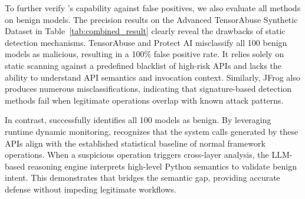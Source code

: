 To further verify \toolname{}'s capability against false positives, we also evaluate all methods on benign models.
The precision results on the Advanced TensorAbuse Synthetic Dataset in Table~\ref{tab:combined_result} clearly reveal the drawbacks of static detection mechanisms. TensorAbuse and Protect AI misclassify all 100 benign models as malicious, resulting in a 100\% false positive rate. It relies solely on static scanning against a predefined blacklist of high-risk APIs and lacks the ability to understand API semantics and invocation context. Similarly, JFrog also produces numerous misclassifications, indicating that signature-based detection methods fail when legitimate operations overlap with known attack patterns.

In contrast, \toolname{} successfully identifies all 100 models as benign. By leveraging runtime dynamic monitoring, \toolname{} recognizes that the system calls generated by these APIs align with the established statistical baseline of normal framework operations. When a suspicious operation triggers cross-layer analysis, the LLM-based reasoning engine interprets high-level Python semantics to validate benign intent. This demonstrates that \toolname{} bridges the semantic gap, providing accurate defense without impeding legitimate workflows.

